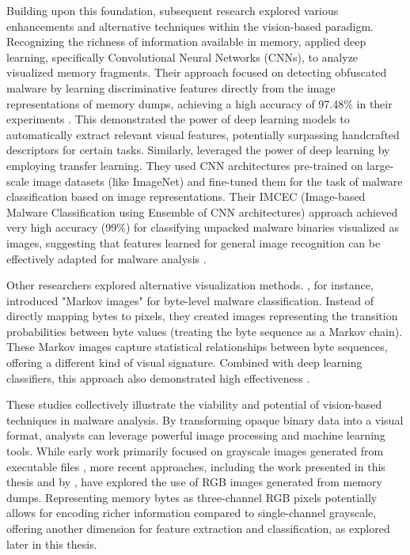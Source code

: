 Building upon this foundation, subsequent research explored various enhancements and alternative techniques within the vision-based paradigm. Recognizing the richness of information available in memory, \citet{zhang2023malware} applied deep learning, specifically Convolutional Neural Networks (CNNs), to analyze visualized memory fragments. Their approach focused on detecting obfuscated malware by learning discriminative features directly from the image representations of memory dumps, achieving a high accuracy of 97.48\% in their experiments \cite{zhang2023malware}. This demonstrated the power of deep learning models to automatically extract relevant visual features, potentially surpassing handcrafted descriptors for certain tasks. Similarly, \citet{vasan2020image} leveraged the power of deep learning by employing transfer learning. They used CNN architectures pre-trained on large-scale image datasets (like ImageNet) and fine-tuned them for the task of malware classification based on image representations. Their IMCEC (Image-based Malware Classification using Ensemble of CNN architectures) approach achieved very high accuracy (99\%) for classifying unpacked malware binaries visualized as images, suggesting that features learned for general image recognition can be effectively adapted for malware analysis \cite{vasan2020image}.

Other researchers explored alternative visualization methods. \citet{yuan2020byte}, for instance, introduced "Markov images" for byte-level malware classification. Instead of directly mapping bytes to pixels, they created images representing the transition probabilities between byte values (treating the byte sequence as a Markov chain). These Markov images capture statistical relationships between byte sequences, offering a different kind of visual signature. Combined with deep learning classifiers, this approach also demonstrated high effectiveness \cite{yuan2020byte}.

These studies collectively illustrate the viability and potential of vision-based techniques in malware analysis. By transforming opaque binary data into a visual format, analysts can leverage powerful image processing and machine learning tools. While early work primarily focused on grayscale images generated from executable files \cite{nataraj2011malware, dai2018malware}, more recent approaches, including the work presented in this thesis and by \citet{bozkir2021catch}, have explored the use of RGB images generated from memory dumps. Representing memory bytes as three-channel RGB pixels potentially allows for encoding richer information compared to single-channel grayscale, offering another dimension for feature extraction and classification, as explored later in this thesis.

